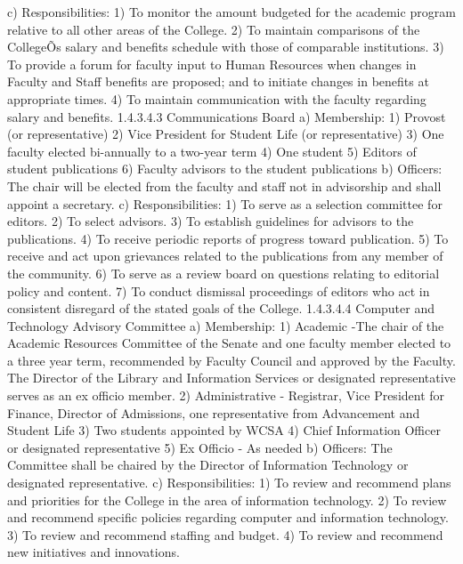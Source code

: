 \documentclass[letterpaper, 11pt]{article}
\begin{document}
				c) Responsibilities:
				1) To monitor the amount budgeted for the academic program relative to all other areas of the College.
				2) To maintain comparisons of the CollegeÕs salary and benefits schedule with those of comparable institutions.
				3) To provide a forum for faculty input to Human Resources when changes in Faculty and Staff benefits are proposed; and to initiate changes in benefits at appropriate times.
				4) To maintain communication with the faculty regarding salary and benefits.
				1.4.3.4.3 Communications Board
				a) Membership:
				1) Provost (or representative)
				2) Vice President for Student Life (or representative)
				3) One faculty elected bi-annually to a two-year term
				4) One student
				5) Editors of student publications
				6) Faculty advisors to the student publications
				b) Officers:
				The chair will be elected from the faculty and staff not in advisorship and shall appoint a secretary.
				c) Responsibilities:
				1) To serve as a selection committee for editors.
				2) To select advisors.
				3) To establish guidelines for advisors to the publications.
				4) To receive periodic reports of progress toward publication.
				5) To receive and act upon grievances related to the publications from any member of the community.
				6) To serve as a review board on questions relating to editorial policy and content.
				7) To conduct dismissal proceedings of editors who act in consistent disregard of the stated goals of the College.
				1.4.3.4.4 Computer and Technology Advisory Committee
				a) Membership:
				1) Academic -The chair of the Academic Resources Committee of the Senate and one faculty member elected to a three year term, recommended by Faculty Council and approved by the Faculty.  The Director of the Library and Information Services or designated representative serves as an ex officio member.
				2) Administrative - Registrar, Vice President for Finance, Director of Admissions, one representative from Advancement and Student Life
				3) Two students appointed by WCSA
				4) Chief Information Officer or designated representative
				5) Ex Officio - As needed
				b) Officers:
				The Committee shall be chaired by the Director of Information Technology or designated representative.
				c) Responsibilities:
				1) To review and recommend plans and priorities for the College in the area of information technology.
				2) To review and recommend specific policies regarding computer and information technology.
				3) To review and recommend staffing and budget.
				4) To review and recommend new initiatives and innovations.
\end{document}
